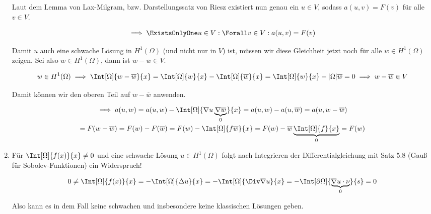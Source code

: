 \begin{solution}
\begin{enumerate}[label = \alph*)]
\begin{enumerate}[label = \arabic*.]
    \end{enumerate}

    Laut dem Lemma von Lax-Milgram, bzw. Darstellungssatz von Riesz existiert nun genau ein $u \in V$, sodass $a(u, v) = F(v)$ für alle $v \in V$.

    \begin{align*}
        \implies
        \ExistsOnlyOne u \in V:
        \Forall v \in V:
        a(u, v) = F(v)
    \end{align*}

    Damit $u$ auch eine schwache Lösung in $H^1(\Omega)$ (und nicht nur in $V$) ist, müssen wir diese Gleichheit jetzt noch für alle $w \in H^1(\Omega)$ zeigen.
    Sei also $w \in H^1(\Omega)$, dann ist $w - \overline{w} \in V$.

    \begin{align*}
        w \in H^1(\Omega)
        \implies
        \Int[\Omega]{w - \overline{w}}{x}
        =
        \Int[\Omega]{w}{x} - \Int[\Omega]{\overline{w}}{x}
        =
        \Int[\Omega]{w}{x} - |\Omega| \overline{w}
        =
        0
        \implies
        w - \overline{w} \in V
    \end{align*}

    Damit können wir den oberen Teil auf $w - \overline{w}$ anwenden.

    \begin{multline*}
        \implies
        a(u, w)
        =
        a(u, w) - \Int[\Omega]{\nabla u \underbrace{\nabla \overline{w}}_0}{x}
        =
        a(u, w) - a(u, \overline{w})
        =
        a(u, w - \overline{w}) \\
        =
        F(w - \overline{w})
        =
        F(w) - F(\overline{w})
        =
        F(w) - \Int[\Omega]{f \overline{w}}{x}
        =
        F(w) - \overline{w} \underbrace{\Int[\Omega]{f}{x}}_0
        =
        F(w)
    \end{multline*}

    \item Für $\Int[\Omega]{f(x)}{x} \neq 0$ und eine schwache Lösung $u \in H^1(\Omega)$ folgt
    nach Integrieren der Differentialgleichung mit Satz 5.8 (Gauß für Sobolev-Funktionen) ein Widerspruch!

    \begin{align*}
        0
        \neq
        \Int[\Omega]{f(x)}{x}
        =
        -\Int[\Omega]{\Delta u}{x}
        =
        -\Int[\Omega]{\Div \nabla u}{x}
        =
        -\Int[\partial \Omega]{\underbrace{\nabla u \cdot \nu}_0}{s}
        =
        0
    \end{align*}

    Also kann es in dem Fall keine schwachen und insbesondere keine klassischen Lösungen geben.

\end{enumerate}

\end{solution}

